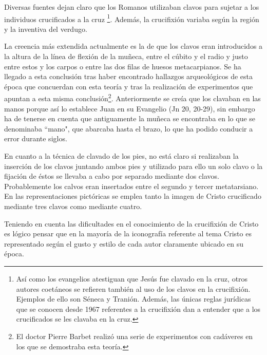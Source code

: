Diversas fuentes dejan claro que los Romanos utilizaban clavos para sujetar a los individuos crucificados a la cruz \footnote{Así como los evangelios atestiguan que Jesús fue clavado en la cruz, otros autores coetáneos se refieren también al uso de los clavos en la crucifixión. Ejemplos de ello son Séneca y Tranión. Además, las únicas reglas jurídicas que se conocen desde 1967 referentes a la crucifixión dan a entender que a los crucificados se les clavaba en la cruz.}. Además, la crucifixión variaba según la región y la inventiva del verdugo.

La creencia más extendida actualmente es la de que los clavos eran introducidos a la altura de la línea de flexión  de la muñeca, entre el cúbito y el radio y justo entre estos y los carpos o entre las dos filas de huesos metacarpianos. Se ha llegado a esta conclusión tras haber encontrado hallazgos arqueológicos de esta época que concuerdan con esta teoría y tras la realización de experimentos que apuntan a esta misma conclusión\footnote{El doctor Pierre Barbet realizó una serie de experimentos con cadáveres en los que se demostraba esta teoría.}. Anteriormente se creía que los clavaban en las manos porque así lo establece Juan en su Evangelio (Jn 20, 20-29), sin embargo ha de tenerse en cuenta que antiguamente la muñeca se encontraba en lo que se denominaba ``mano", que abarcaba hasta el brazo, lo que ha podido conducir a error durante siglos.

En cuanto a la técnica de clavado de los pies, no está claro si realizaban la inserción de los clavos juntando ambos pies y utilizado para ello un solo clavo o la fijación de éstos se llevaba a cabo por separado mediante dos clavos. Probablemente los calvos eran insertados entre el segundo y tercer metatarsiano. En las representaciones pictóricas se emplea tanto la imagen de Cristo crucificado mediante tres clavos como mediante cuatro.

Teniendo en cuenta las dificultades en el conocimiento de la crucifixión de Cristo es lógico pensar que en la mayoría de la iconografía referente al tema Cristo es representado según el gusto y estilo de cada autor claramente ubicado en su época.


